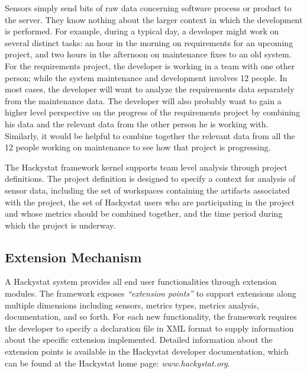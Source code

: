 Sensors simply send bits of raw data concerning software process or product to the server. They know nothing about the larger context in which the development is performed. For example, during a typical day, a developer might work on several distinct tasks: an hour in the morning on requirements for an upcoming project, and two hours in the afternoon on maintenance fixes to an old system. For the requirements project, the developer is working in a team with one other person; while the system maintenance and development involves 12 people. In most cases, the developer will want to analyze the requirements data separately from the maintenance data. The developer will also probably want to gain a higher level perspective on the progress of the requirements project by combining his data and the relevant data from the other person he is working with. Similarly, it would be helpful to combine together the relevant data from all the 12 people working on maintenance to see how that project is progressing.
 
The Hackystat framework kernel supports team level analysis through project definitions. The project definition is designed to specify a context for analysis of sensor data, including the set of workspaces containing the artifacts associated with the project, the set of Hackystat users who are participating in the project and whose metrics should be combined together, and the time period during which the project is underway.




\subsection{Extension Mechanism}

A Hackystat system provides all end user functionalities through extension modules. The framework exposes \textit{``extension points''} to support extensions along multiple dimensions including sensors, metrics types, metrics analysis, documentation, and so forth. For each new functionality, the framework requires the developer to specify a declaration file in XML format to supply information about the specific extension implemented. Detailed information about the extension points is available in the Hackystat developer documentation, which can be found at the Hackystat home page: \textit{www.hackystat.org}. 






